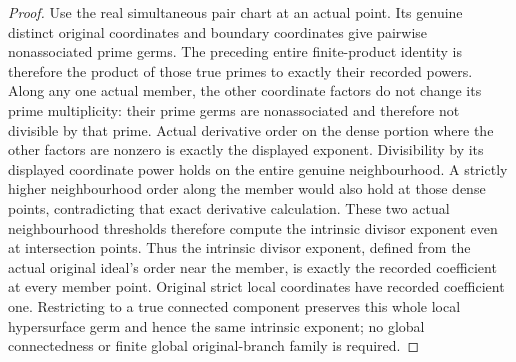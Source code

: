 \begin{proof}
Use the real simultaneous pair chart at an actual point. Its genuine distinct
original coordinates and boundary coordinates give pairwise nonassociated
prime germs. The preceding entire finite-product identity is therefore the
product of those true primes to exactly their recorded powers. Along any one
actual member, the other coordinate factors do not change its prime
multiplicity: their prime germs are nonassociated and therefore not divisible
by that prime. Actual derivative order on the dense portion where the other
factors are nonzero is exactly the displayed exponent. Divisibility by its
displayed coordinate power holds on the entire genuine neighbourhood. A
strictly higher neighbourhood order along the member would also hold at those
dense points, contradicting that exact derivative calculation. These two
actual neighbourhood thresholds therefore compute the intrinsic divisor
exponent even at intersection points. Thus the intrinsic divisor exponent,
defined from the actual original ideal's order near the member, is exactly the recorded
coefficient at every member point. Original strict local coordinates have
recorded coefficient one. Restricting to a true connected component preserves
this whole local hypersurface germ and hence the same intrinsic exponent;
no global connectedness or finite global original-branch family is required.
\end{proof}

